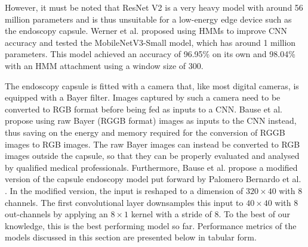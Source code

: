 \documentclass[11pt,a4paper, open=any]{scrbook}
\begin{document}
However, it must be noted that ResNet V2 is a very heavy model with around 56 million parameters and is thus unsuitable for a low-energy edge device such as the endoscopy capsule. Werner et al. proposed using HMMs to improve CNN accuracy and tested the MobileNetV3-Small model, which has around 1 million parameters. This model achieved an accuracy of 96.95\% on its own and 98.04\% with an HMM attachment using a window size of 300. 

The endoscopy capsule is fitted with a camera that, like most digital cameras, is equipped with a Bayer filter. Images captured by such a camera need to be converted to RGB format before being fed as inputs to a CNN.  Bause et al. propose using raw Bayer (RGGB format) images as inputs to the CNN instead, thus saving on the energy and memory required for the conversion of RGGB images to RGB images. The raw Bayer images can instead be converted to RGB images outside the capsule, so that they can be properly evaluated and analysed by qualified medical professionals. Furthermore, Bause et al. propose a modified version of the capsule endoscopy model put forward by Palomero Bernardo et al. \cite{bernardo25}. In the modified version, the input is reshaped to a dimension of $320\times 40$ with 8 channels. The first convolutional layer downsamples this input to $40 \times 40$ with 8 out-channels by applying an $8\times 1$ kernel with a stride of 8. To the best of our knowledge, this is the best performing model so far. Performance metrics of the models discussed in this section are presented below in tabular form.
\end{document}
